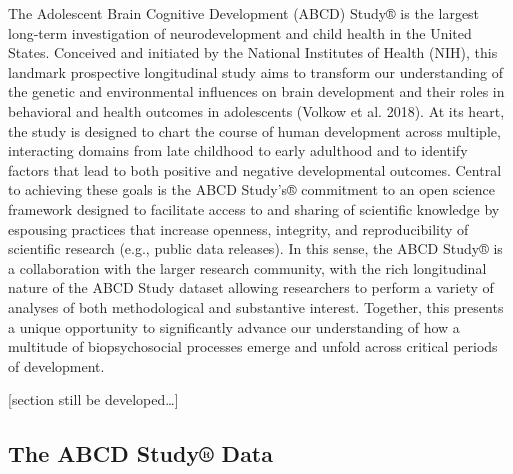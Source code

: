 \documentclass[
  letterpaper,
  DIV=11,
  numbers=noendperiod]{scrartcl}
\begin{document}
\label{sec:headings} The Adolescent Brain Cognitive Development (ABCD)
Study® is the largest long-term investigation of neurodevelopment and
child health in the United States. Conceived and initiated by the
National Institutes of Health (NIH), this landmark prospective
longitudinal study aims to transform our understanding of the genetic
and environmental influences on brain development and their roles in
behavioral and health outcomes in adolescents (Volkow et al. 2018). At
its heart, the study is designed to chart the course of human
development across multiple, interacting domains from late childhood to
early adulthood and to identify factors that lead to both positive and
negative developmental outcomes. Central to achieving these goals is the
ABCD Study's® commitment to an open science framework designed to
facilitate access to and sharing of scientific knowledge by espousing
practices that increase openness, integrity, and reproducibility of
scientific research (e.g., public data releases). In this sense, the
ABCD Study® is a collaboration with the larger research community, with
the rich longitudinal nature of the ABCD Study dataset allowing
researchers to perform a variety of analyses of both methodological and
substantive interest. Together, this presents a unique opportunity to
significantly advance our understanding of how a multitude of
biopsychosocial processes emerge and unfold across critical periods of
development.

{[}section still be developed\ldots{]}

\hypertarget{the-abcd-study-data}{%
\subsection{The ABCD Study® Data}\label{the-abcd-study-data}}
\end{document}
